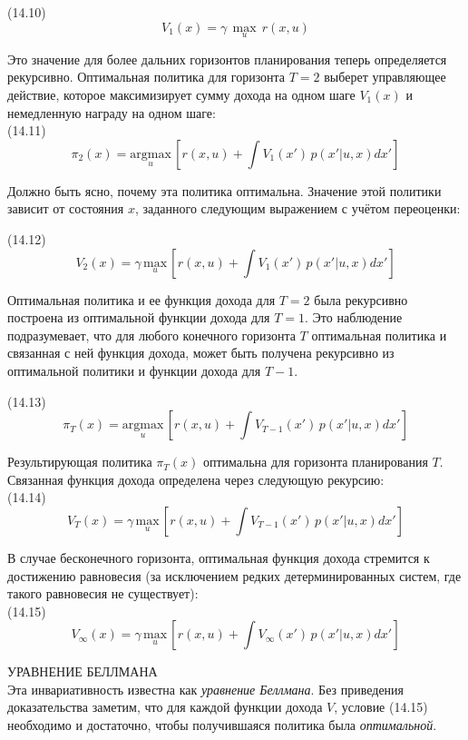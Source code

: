 \documentclass[10pt,a4paper]{article}
\begin{document}
(14.10)
$$V_1(x)=\gamma\,\underset{u}{\max}\,r(x,u)$$

Это значение для более дальних горизонтов планирования теперь определяется рекурсивно. Оптимальная политика для горизонта $T = 2$ выберет управляющее действие, которое максимизирует сумму дохода на одном шаге $V_1(x)$ и немедленную награду на одном шаге:\\

(14.11)
$$\pi_2(x)=\underset{u}{\text{argmax}}\,\left[r(x,u)+\int V_1(x')\,p(x'|u,x)dx'\right]$$ 

Должно быть ясно, почему эта политика оптимальна. Значение этой политики зависит от состояния $x$, заданного следующим выражением с учётом переоценки:

(14.12)
$$V_2(x)=\gamma\,\underset{u}{\text{max}}\,\left[r(x,u)+\int V_1(x')\,p(x'|u,x)dx'\right]$$

Оптимальная политика и ее функция дохода для $T = 2$ была рекурсивно построена из оптимальной функции дохода для $T = 1$. Это наблюдение подразумевает, что для любого конечного горизонта $T$ оптимальная политика и связанная с ней функция дохода, может быть получена рекурсивно из оптимальной политики и функции дохода для $T-1$.

(14.13)
$$\pi_T(x)=\underset{u}{\text{argmax}}\,\left[r(x,u)+\int V_{T-1}(x')\,p(x'|u,x)dx'\right]$$

Результирующая политика $\pi_T (x)$ оптимальна для горизонта планирования $T$. Связанная функция дохода определена через следующую рекурсию:\\

(14.14)
$$V_T(x)=\gamma\,\underset{u}{\text{max}}\,\left[r(x,u)+\int V_{T-1}(x')\,p(x'|u,x)dx'\right]$$

В случае бесконечного горизонта, оптимальная функция дохода стремится к достижению равновесия (за исключением редких детерминированных систем, где такого равновесия не существует):\\

(14.15)
$$V_\infty(x)=\gamma\,\underset{u}{\text{max}}\,\left[r(x,u)+\int V_\infty(x')\,p(x'|u,x)dx'\right]$$

УРАВНЕНИЕ БЕЛЛМАНА\\

Эта инвариативность известна как \textit{уравнение Беллмана}. Без приведения доказательства заметим, что для каждой функции дохода $V$, условие (14.15) необходимо и достаточно, чтобы получившаяся политика была \textit{оптимальной}.\\
\end{document}
